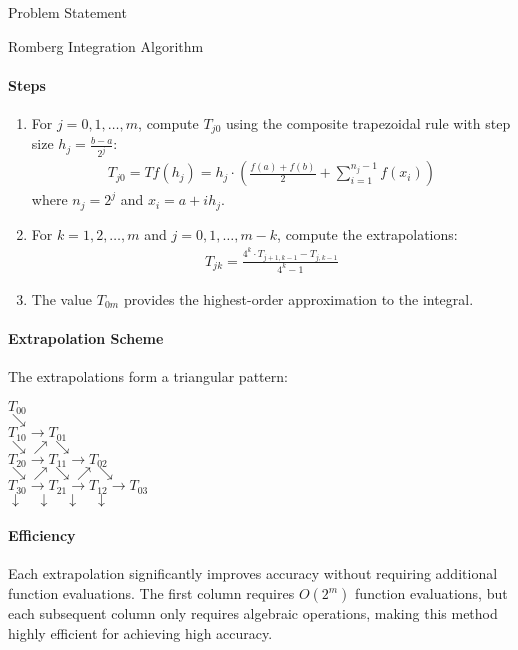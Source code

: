 \begin{concept}{Problem Statement}
\begin{KR}{Romberg Integration Algorithm}\\
\paragraph{Steps}
\begin{enumerate}
    \item For $j = 0, 1, \ldots, m$, compute $T_{j0}$ using the composite trapezoidal rule with step size $h_j = \frac{b-a}{2^j}$:
    \begin{align*}
    T_{j0} = Tf(h_j) = h_j \cdot \left(\frac{f(a) + f(b)}{2} + \sum_{i=1}^{n_j-1} f(x_i)\right)
    \end{align*}
    where $n_j = 2^j$ and $x_i = a + ih_j$.
    
    \item For $k = 1, 2, \ldots, m$ and $j = 0, 1, \ldots, m-k$, compute the extrapolations:
    \begin{align*}
    T_{jk} = \frac{4^k \cdot T_{j+1,k-1} - T_{j,k-1}}{4^k - 1}
    \end{align*}
    
    \item The value $T_{0m}$ provides the highest-order approximation to the integral.
\end{enumerate}

\paragraph{Extrapolation Scheme}
The extrapolations form a triangular pattern:
\begin{center}
$T_{00}$ \\
$\searrow$ \\
$T_{10} \rightarrow T_{01}$ \\
$\searrow \nearrow \searrow$ \\
$T_{20} \rightarrow T_{11} \rightarrow T_{02}$ \\
$\searrow \nearrow \searrow \nearrow \searrow$ \\
$T_{30} \rightarrow T_{21} \rightarrow T_{12} \rightarrow T_{03}$ \\
$\downarrow \quad \downarrow \quad \downarrow \quad \downarrow$ \\
\end{center}

\paragraph{Efficiency}
Each extrapolation significantly improves accuracy without requiring additional function evaluations. The first column requires $O(2^m)$ function evaluations, but each subsequent column only requires algebraic operations, making this method highly efficient for achieving high accuracy.
\end{KR}


\end{concept}
